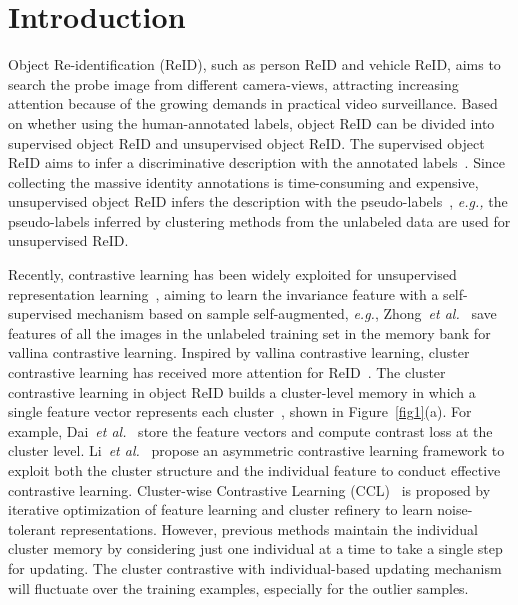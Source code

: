 \documentclass[10pt,twocolumn,letterpaper]{article}
\begin{document}
\section{Introduction}\label{sec:intro}
Object Re-identification (ReID), such as person ReID and vehicle ReID, aims to search the probe image from different camera-views, attracting increasing attention because of the growing demands in practical video surveillance.
Based on whether using the human-annotated labels, object ReID can be divided into supervised object ReID and unsupervised object ReID.
The supervised object ReID aims to infer a discriminative description with the annotated labels~\cite{Zhang_2020_CVPR, Chen_2021_ICCV, zhang2021person, xia2019second, chen2019mixed, quadruplet, large-margin-learning,he2019part,he2020multi,He_2021_ICCV,meng2020parsing}.
Since collecting the massive identity annotations is time-consuming and expensive, unsupervised object ReID infers the description with the pseudo-labels~\cite{Chen_2019_ICCV, Liu_2019_CVPR, zhong2018generalizing, fu2019self, Zhang_2019_ICCV, ge2020mutual,DBLP:conf/nips/Ge0C0L20,dai2021cluster,DBLP:conf/cvpr/ZhangG0021}, \emph{e.g.,} the pseudo-labels inferred by clustering methods from the unlabeled data are used for unsupervised ReID. 

Recently, contrastive learning has been widely exploited for unsupervised representation learning~\cite{DBLP:conf/nips/Ge0C0L20,DBLP:conf/icml/ChenK0H20,DBLP:conf/nips/CaronMMGBJ20,DBLP:conf/cvpr/ChenH21,chen2021joint}, aiming to learn the invariance feature with a self-supervised mechanism based on sample self-augmented, \emph{e.g.}, Zhong~\emph{et al.}~\cite{zhong2019invariance} save features of all the images in the unlabeled training set in the memory bank for vallina contrastive learning.
Inspired by vallina contrastive learning, cluster contrastive learning has received more attention for ReID~\cite{dai2021cluster,li2021cluster,DBLP:conf/cvpr/XiaoLWLW17,DBLP:conf/nips/Ge0C0L20}.
The cluster contrastive learning in object ReID builds a cluster-level memory in which a single feature vector represents each cluster~\cite{dai2021cluster}, shown in Figure~\ref{fig1}(a).
For example, Dai~\emph{et al.}~\cite{dai2021cluster} store the feature vectors and compute contrast loss at the cluster level.
Li~\emph{et al.}~\cite{li2021cluster} propose an asymmetric contrastive learning framework to exploit both the cluster structure and the individual feature to conduct effective contrastive learning.
Cluster-wise Contrastive Learning (CCL)~\cite{isobe2021towards} is proposed by iterative optimization of feature learning and cluster refinery to learn noise-tolerant representations.
However, previous methods maintain the individual cluster memory by considering just one individual at a time to take a single step for updating.
The cluster contrastive with individual-based updating mechanism will fluctuate over the training examples, especially for the outlier samples.  
\end{document}
